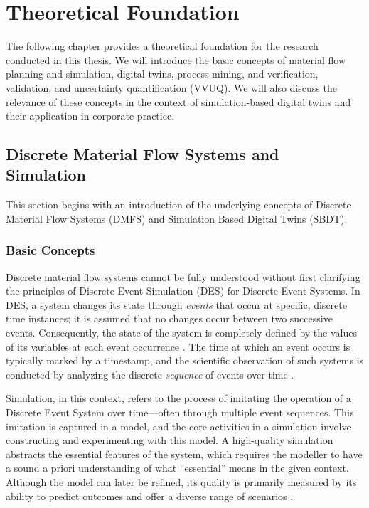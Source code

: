 \chapter{Theoretical Foundation}
\label{chap:theory}

The following chapter provides a theoretical foundation for the research conducted in this thesis. We will introduce the basic concepts of material flow planning and simulation, digital twins, process mining, and verification, validation, and uncertainty quantification (VVUQ). We will also discuss the relevance of these concepts in the context of simulation-based digital twins and their application in corporate practice.


\section{Discrete Material Flow Systems and Simulation}
This section begins with an introduction of the underlying concepts of Discrete Material Flow Systems (DMFS) and Simulation Based Digital Twins (SBDT).
\label{sec:material-flow}
\subsection{Basic Concepts}
Discrete material flow systems cannot be fully understood without first clarifying the principles of Discrete Event Simulation (DES) for Discrete Event Systems. In DES, a system changes its state through \textit{events} that occur at specific, discrete time instances; it is assumed that no changes occur between two successive events. Consequently, the state of the system is completely defined by the values of its variables at each event occurrence \parencite{varga2001discrete}. The time at which an event occurs is typically marked by a timestamp, and the scientific observation of such systems is conducted by analyzing the discrete \textit{sequence} of events over time \parencite{robinson2014simulation}.

Simulation, in this context, refers to the process of imitating the operation of a Discrete Event System over time—often through multiple event sequences. This imitation is captured in a model, and the core activities in a simulation involve constructing and experimenting with this model. A high-quality simulation abstracts the essential features of the system, which requires the modeller to have a sound a priori understanding of what “essential” means in the given context. Although the model can later be refined, its quality is primarily measured by its ability to predict outcomes and offer a diverse range of scenarios \parencite{maria1997introduction}.

